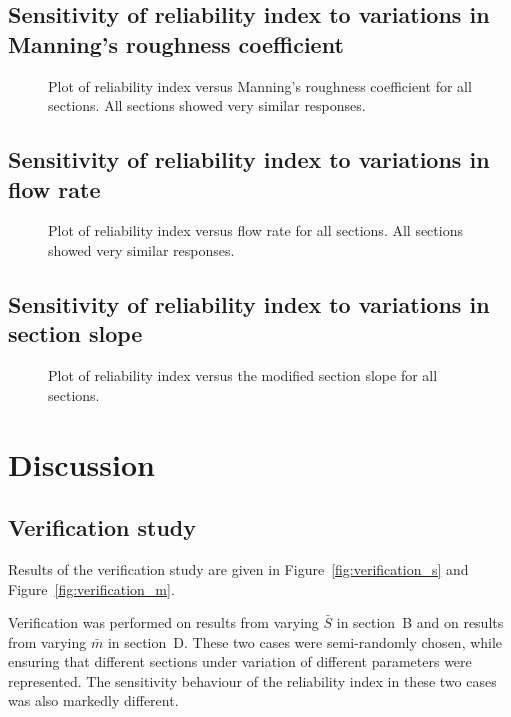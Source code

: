 \documentclass[a4paper]{article}
\begin{document}
\subsection{Sensitivity of reliability index to variations in Manning's roughness coefficient}
\begin{figure}[H]
\centering

\caption{Plot of reliability index versus Manning's roughness coefficient for all sections.
         All sections showed very similar responses.}
\label{fig:vary_n}
\end{figure}

\subsection{Sensitivity of reliability index to variations in flow rate}
\begin{figure}[H]
\centering

\caption{Plot of reliability index versus flow rate for all sections.
         All sections showed very similar responses.}
\label{fig:vary_q}
\end{figure}

\subsection{Sensitivity of reliability index to variations in section slope}
\begin{figure}[H]
\centering

\caption{Plot of reliability index versus the modified section slope for all sections.}
\label{fig:vary_m}
\end{figure}


\clearpage
\section{Discussion}
\subsection{Verification study}
Results of the verification study are given in Figure~\ref{fig:verification_s} and
Figure~\ref{fig:verification_m}.

Verification was performed on results from varying $\bar{S}$ in section~B
and on results from varying $\bar{m}$ in section~D.
These two cases were semi-randomly chosen, while ensuring that different sections 
under variation of different parameters were represented.
The sensitivity behaviour of the reliability index in these two cases 
was also markedly different.
\end{document}
